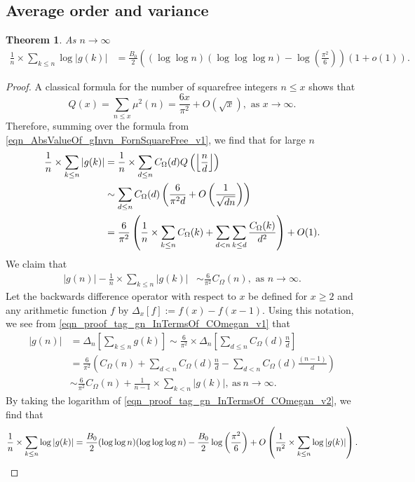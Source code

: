 \documentclass[11pt,reqno,a4letter]{article}
\numberwithin{equation}{section}
\numberwithin{figure}{section}
\numberwithin{table}{section}
\newcommand{\seqnum}[1]{\href{http://oeis.org/#1}{\color{ProcessBlue}{\underline{#1}}}}
\newcommand{\Floor}[2]{\ensuremath{\left\lfloor \frac{#1}{#2} \right\rfloor}}
\theoremstyle{plain}
\newtheorem{theorem}{Theorem}
\numberwithin{theorem}{section}
\theoremstyle{definition}
\begin{document}
\subsection{Average order and variance} 

\begin{theorem} 
\label{cor_ExpectationFormulaAbsgInvn_v2} 
As $n \rightarrow \infty$ 
\begin{align*} 
\frac{1}{n} \times \sum_{k \leq n} \log |g(k)| & = 
	\frac{B_0}{2} \left((\log\log n)(\log\log\log n) - 
	\log\left(\frac{\pi^2}{6}\right)\right)(1 + o(1)). 
\end{align*} 
\end{theorem} 
\begin{proof}
A classical formula for the number of squarefree integers $n \leq x$ shows that 
\cite[\S 18.6]{HARDYWRIGHT} \cite[\seqnum{A013928}]{OEIS} 
\[ 
Q(x) = \sum_{n \leq x} \mu^2(n) = \frac{6x}{\pi^2} + O\left(\sqrt{x}\right), 
     \text{\ as $x \rightarrow \infty$}. 
\]
Therefore, summing over the formula from 
\eqref{eqn_AbsValueOf_gInvn_FornSquareFree_v1}, we find that for large $n$  
\begin{align} 
\notag 
\frac{1}{n} \times \sum_{k \leq n} |g(k)| & = \frac{1}{n} \times \sum_{d \leq n} 
     C_{\Omega}(d) Q\left(\Floor{n}{d}\right) \\ 
\notag 
     & \sim \sum_{d \leq n} C_{\Omega}(d) \left(\frac{6}{\pi^2 d} + O\left(\frac{1}{\sqrt{dn}}\right) 
     \right) \\ 
\label{eqn_proof_tag_gn_InTermsOf_COmegan_v1}
     & = \frac{6}{\pi^2} \left(\frac{1}{n} \times \sum_{k \leq n} C_{\Omega}(k) + \sum_{d<n} 
     \sum_{k \leq d} \frac{C_{\Omega}(k)}{d^2}\right) + O(1). 
\end{align} 
We claim that 
\begin{align}
\label{eqn_proof_tag_gn_InTermsOf_COmegan_v2}
|g(n)| - \frac{1}{n} \times \sum_{k \leq n} |g(k)| & \sim \frac{6}{\pi^2} C_{\Omega}(n), 
     \text{\ as\ } n \rightarrow \infty. 
\end{align} 
Let the backwards difference operator with respect to $x$ 
be defined for $x \geq 2$ and any arithmetic function $f$ by 
$\Delta_x[f] := f(x) - f(x-1)$. 
Using this notation, we see from \eqref{eqn_proof_tag_gn_InTermsOf_COmegan_v1} that 
\begin{align*} 
     |g(n)| & = \Delta_n\left[\sum_{k \leq n} g(k)\right]  
     \sim \frac{6}{\pi^2} \times 
     \Delta_n\left[\sum_{d \leq n} C_{\Omega}(d) \frac{n}{d}\right] \\ 
     & = \frac{6}{\pi^2}\left(C_{\Omega}(n) + \sum_{d < n} C_{\Omega}(d) \frac{n}{d} - 
     \sum_{d<n} C_{\Omega}(d) \frac{(n-1)}{d}\right) \\ 
     & \sim \frac{6}{\pi^2} C_{\Omega}(n) + \frac{1}{n-1} \times \sum_{k < n} |g(k)|, 
     \mathrm{\ as\ } n \rightarrow \infty. 
\end{align*} 
By taking the logarithm of \eqref{eqn_proof_tag_gn_InTermsOf_COmegan_v2}, we find that
\[
\frac{1}{n} \times \sum_{k \leq n} \log |g(k)| = 
     \frac{B_0}{2} (\log\log n) (\log\log\log n) - 
     \frac{B_0}{2}\log\left(\frac{\pi^2}{6}\right) + 
     O\left(\frac{1}{n^2} \times \sum_{k \leq n} \log |g(k)|\right). 
     \qedhere
\]
\end{proof} 
\end{document}
